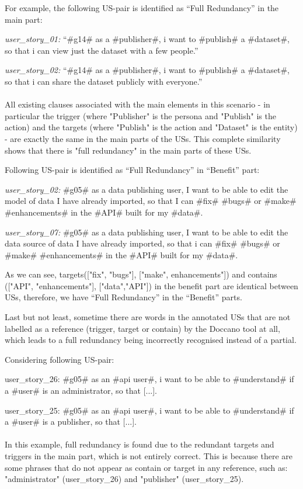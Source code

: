 \begin{example}
	For example, the following US-pair is identified as \enquote{Full Redundancy} in the main part:
	
	\textit{user\_story\_01:} \enquote{\#g14\# as a \#publisher\#, i want to \#publish\# a \#dataset\#, so that i can view just the dataset with a few people.}
	
	\textit{user\_story\_02:} \enquote{\#g14\# as a \#publisher\#, i want to \#publish\# a \#dataset\#, so that i can share the dataset publicly with everyone.}\\\\
	All existing clauses associated with the main elements in this scenario - in particular the trigger (where "Publisher" is the persona and "Publish" is the action) and the targets (where "Publish" is the action and "Dataset" is the entity) - are exactly the same in the main parts of the USs. This complete similarity shows that there is "full redundancy" in the main parts of these USs.
\end{example}
\begin{example}
	Following US-pair is identified as \enquote{Full Redundancy} in \enquote{Benefit} part:
	
	\textit{user\_story\_02:} \#g05\# as a data publishing user, I want to be able to edit the model of data I have already imported, so that I can \#fix\# \#bugs\# or \#make\# \#enhancements\# in the \#API\# built for my \#data\#.
	
	\textit{user\_story\_07:} \#g05\# as a data publishing user, I want to be able to edit the data source of data I have already imported, so that i can \#fix\# \#bugs\# or \#make\# \#enhancements\# in the \#API\# built for my \#data\#.
	
	As we can see, targets(["fix", "bugs"], ["make", enhancements"]) and contains (["API", "enhancements"], ["data","API"]) in the benefit part are identical between USs, therefore, we have \enquote{Full Redundancy} in the \enquote{Benefit} parts.
\end{example}
Last but not least, sometime there are words in the annotated USs that are not labelled as a reference (trigger, target or contain) by the Doccano tool at all, which leads to a full redundancy being incorrectly recognised instead of a partial.
\begin{example}
	Considering following US-pair:
	
 	user\_story\_26: \#g05\# as an \#api user\#, i want to be able to \#understand\# if a \#user\# is an administrator, so that [...].
 	
 	user\_story\_25: \#g05\# as an \#api user\#, i want to be able to \#understand\# if a \#user\# is a publisher, so that [...].\\\\
	In this example, full redundancy is found due to the redundant targets and triggers in the main part, which is not entirely correct. This is because there are some phrases that do not appear as contain or target in any reference, such as: "administrator" (user\_story\_26) and "publisher" (user\_story\_25).
\end{example}

